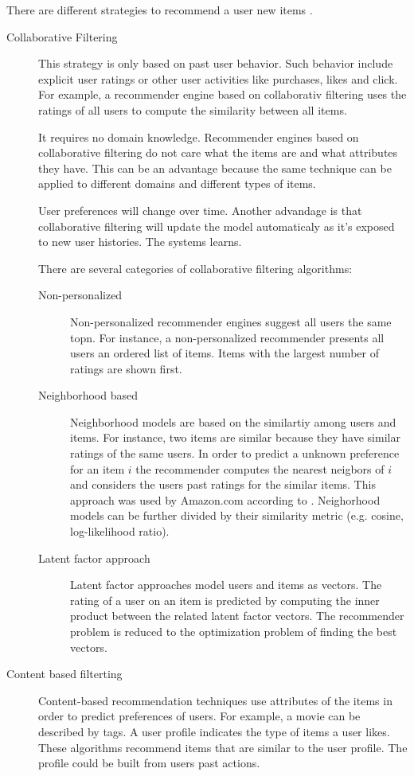 There are different strategies to recommend a user new items \cite{jannach11}.
\begin{description}
\item[Collaborative Filtering] This strategy is only based on past user behavior. Such behavior include explicit user ratings or other user activities like purchases, likes and click. For example, a recommender engine based on collaborativ filtering uses the ratings of all users to compute the similarity between all items. 

It requires no domain knowledge. Recommender engines based on collaborative filtering do not care what the items are and what attributes they have. This can be an advantage because the same technique can be applied to different domains and different types of items. 

User preferences will change over time. Another advandage is that collaborative filtering will update the model automaticaly as it's exposed to new user histories. The systems learns.

There are several categories of collaborative filtering algorithms:
\begin{description}
\item[Non-personalized] Non-personalized recommender engines suggest all users the same \gls{topn}. For instance, a non-personalized recommender presents all users an ordered list of items. Items with the largest number of ratings are shown first.
\item[Neighborhood based] Neighborhood models are based on the similartiy among users and items. For instance, two items are similar because they have similar ratings of the same users. In order to predict a unknown preference for an item $i$ the recommender computes the nearest neigbors of $i$ and considers the users past ratings for the similar items. This approach was used by Amazon.com according to \cite{Linden}. Neighorhood models can be further divided by their similarity metric (e.g. cosine, log-likelihood ratio).
\item[Latent factor approach] Latent factor approaches model users and items as vectors. The rating of a user on an item is predicted by computing the inner product between the related latent factor vectors. The recommender problem is reduced to the optimization problem of finding the best vectors.
\end{description}
\item[Content based filterting] Content-based recommendation techniques use attributes of the items in order to predict preferences of users. For example, a movie can be described by \glspl{tag}. A user profile indicates the type of items a user likes. These algorithms recommend items that are similar to the user profile. The profile could be built from users past actions.
\end{description}

